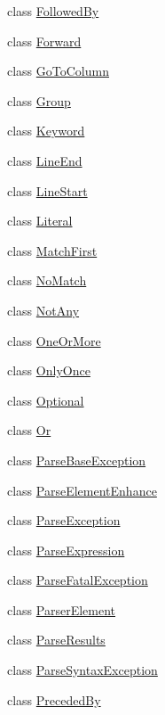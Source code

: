 \begin{DoxyCompactItemize}
class \hyperlink{classpyparsing_1_1FollowedBy}{Followed\+By}
\item 
class \hyperlink{classpyparsing_1_1Forward}{Forward}
\item 
class \hyperlink{classpyparsing_1_1GoToColumn}{Go\+To\+Column}
\item 
class \hyperlink{classpyparsing_1_1Group}{Group}
\item 
class \hyperlink{classpyparsing_1_1Keyword}{Keyword}
\item 
class \hyperlink{classpyparsing_1_1LineEnd}{Line\+End}
\item 
class \hyperlink{classpyparsing_1_1LineStart}{Line\+Start}
\item 
class \hyperlink{classpyparsing_1_1Literal}{Literal}
\item 
class \hyperlink{classpyparsing_1_1MatchFirst}{Match\+First}
\item 
class \hyperlink{classpyparsing_1_1NoMatch}{No\+Match}
\item 
class \hyperlink{classpyparsing_1_1NotAny}{Not\+Any}
\item 
class \hyperlink{classpyparsing_1_1OneOrMore}{One\+Or\+More}
\item 
class \hyperlink{classpyparsing_1_1OnlyOnce}{Only\+Once}
\item 
class \hyperlink{classpyparsing_1_1Optional}{Optional}
\item 
class \hyperlink{classpyparsing_1_1Or}{Or}
\item 
class \hyperlink{classpyparsing_1_1ParseBaseException}{Parse\+Base\+Exception}
\item 
class \hyperlink{classpyparsing_1_1ParseElementEnhance}{Parse\+Element\+Enhance}
\item 
class \hyperlink{classpyparsing_1_1ParseException}{Parse\+Exception}
\item 
class \hyperlink{classpyparsing_1_1ParseExpression}{Parse\+Expression}
\item 
class \hyperlink{classpyparsing_1_1ParseFatalException}{Parse\+Fatal\+Exception}
\item 
class \hyperlink{classpyparsing_1_1ParserElement}{Parser\+Element}
\item 
class \hyperlink{classpyparsing_1_1ParseResults}{Parse\+Results}
\item 
class \hyperlink{classpyparsing_1_1ParseSyntaxException}{Parse\+Syntax\+Exception}
\item 
class \hyperlink{classpyparsing_1_1PrecededBy}{Preceded\+By}
\item 

\end{DoxyCompactItemize}
